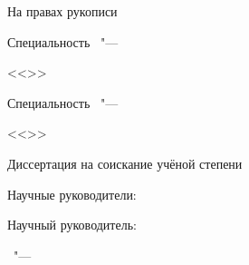 \thispagestyle{empty}
\begin{center}
\end{center}
%
\vspace{0pt plus4fill} %
{
\begin{flushright}
На правах рукописи

\end{flushright}
}
%
\vspace{0pt plus6fill} %
\begin{center}
{\large \thesisAuthor}
\end{center}
%
\vspace{0pt plus1fill} %
\begin{center}
\textbf {\large %
\thesisTitle}

\vspace{0pt plus2fill} %
{%
Специальность \thesisSpecialtyNumber\ "---

<<\thesisSpecialtyTitle>>
}

\ifdefined\thesisSpecialtyTwoNumber
{%
Специальность \thesisSpecialtyTwoNumber\ "---

<<\thesisSpecialtyTwoTitle>>
}
\fi

\vspace{0pt plus2fill} %
Диссертация на соискание учёной степени

\thesisDegree
\end{center}
%
\vspace{0pt plus4fill} %
\begin{flushright}
\ifdefined\supervisorTwoFio
Научные руководители:

\supervisorRegalia

\ifdefined\supervisorDead
\framebox{\supervisorFio}
\else
\supervisorFio
\fi

\supervisorTwoRegalia

\ifdefined\supervisorTwoDead
\framebox{\supervisorTwoFio}
\else
\supervisorTwoFio
\fi
\else
Научный руководитель:

\supervisorRegalia

\ifdefined\supervisorDead
\framebox{\supervisorFio}
\else
\supervisorFio
\fi
\fi

\end{flushright}
%
\vspace{0pt plus4fill} %
{\centering\thesisCity\ "--- \thesisYear\par}
